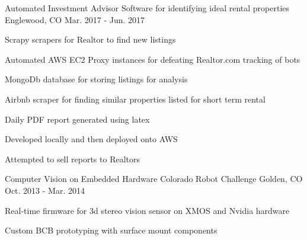 \begin{cventries}
  \cventry
    {Automated Investment Advisor}
    {Software for identifying ideal rental properties}
    {Englewood, CO} %
    {Mar. 2017 - Jun. 2017} %
    {
      \begin{cvitems} %
        \item {Scrapy scrapers for Realtor to find new listings}
        \item {Automated AWS EC2 Proxy instances for defeating Realtor.com tracking of bots}
        \item {MongoDb database for storing listings for analysis}
        \item {Airbnb scraper for finding similar properties listed for short term rental}
        \item {Daily PDF report generated using latex}
        \item {Developed locally and then deployed onto AWS}
        \item {Attempted to sell reports to Realtors}
      \end{cvitems}
    }


  \cventry
    {Computer Vision on Embedded Hardware}
    {Colorado Robot Challenge}
    {Golden, CO} %
    {Oct. 2013 - Mar. 2014} %
    {
      \begin{cvitems} %
        \item {Real-time firmware for 3d stereo vision sensor on XMOS and Nvidia hardware}
        \item {Custom BCB prototyping with surface mount components}
      \end{cvitems}
    }

\end{cventries}
